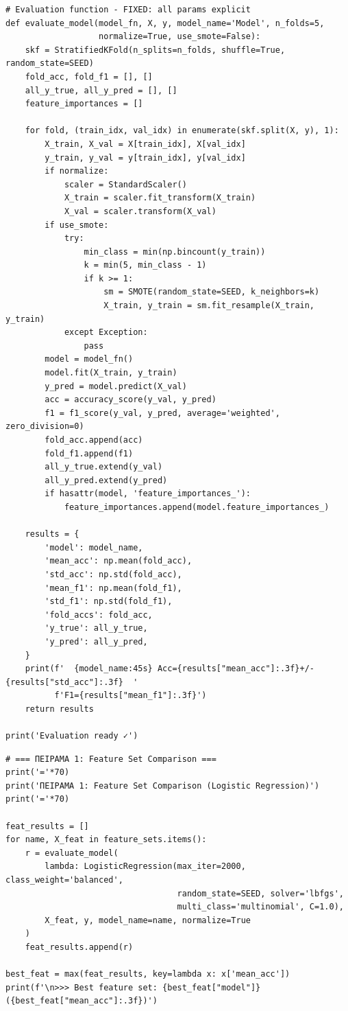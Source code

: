 \begin{lstlisting}
# Evaluation function - FIXED: all params explicit
def evaluate_model(model_fn, X, y, model_name='Model', n_folds=5,
                   normalize=True, use_smote=False):
    skf = StratifiedKFold(n_splits=n_folds, shuffle=True, random_state=SEED)
    fold_acc, fold_f1 = [], []
    all_y_true, all_y_pred = [], []
    feature_importances = []
 
    for fold, (train_idx, val_idx) in enumerate(skf.split(X, y), 1):
        X_train, X_val = X[train_idx], X[val_idx]
        y_train, y_val = y[train_idx], y[val_idx]
        if normalize:
            scaler = StandardScaler()
            X_train = scaler.fit_transform(X_train)
            X_val = scaler.transform(X_val)
        if use_smote:
            try:
                min_class = min(np.bincount(y_train))
                k = min(5, min_class - 1)
                if k >= 1:
                    sm = SMOTE(random_state=SEED, k_neighbors=k)
                    X_train, y_train = sm.fit_resample(X_train, y_train)
            except Exception:
                pass
        model = model_fn()
        model.fit(X_train, y_train)
        y_pred = model.predict(X_val)
        acc = accuracy_score(y_val, y_pred)
        f1 = f1_score(y_val, y_pred, average='weighted', zero_division=0)
        fold_acc.append(acc)
        fold_f1.append(f1)
        all_y_true.extend(y_val)
        all_y_pred.extend(y_pred)
        if hasattr(model, 'feature_importances_'):
            feature_importances.append(model.feature_importances_)
 
    results = {
        'model': model_name,
        'mean_acc': np.mean(fold_acc),
        'std_acc': np.std(fold_acc),
        'mean_f1': np.mean(fold_f1),
        'std_f1': np.std(fold_f1),
        'fold_accs': fold_acc,
        'y_true': all_y_true,
        'y_pred': all_y_pred,
    }
    print(f'  {model_name:45s} Acc={results["mean_acc"]:.3f}+/-{results["std_acc"]:.3f}  '
          f'F1={results["mean_f1"]:.3f}')
    return results
 
print('Evaluation ready ✓')
\end{lstlisting}
 
\begin{lstlisting}
# === ΠΕΙΡΑΜΑ 1: Feature Set Comparison ===
print('='*70)
print('ΠΕΙΡΑΜΑ 1: Feature Set Comparison (Logistic Regression)')
print('='*70)
 
feat_results = []
for name, X_feat in feature_sets.items():
    r = evaluate_model(
        lambda: LogisticRegression(max_iter=2000, class_weight='balanced',
                                   random_state=SEED, solver='lbfgs',
                                   multi_class='multinomial', C=1.0),
        X_feat, y, model_name=name, normalize=True
    )
    feat_results.append(r)
 
best_feat = max(feat_results, key=lambda x: x['mean_acc'])
print(f'\n>>> Best feature set: {best_feat["model"]} ({best_feat["mean_acc"]:.3f})')
\end{lstlisting}
 
